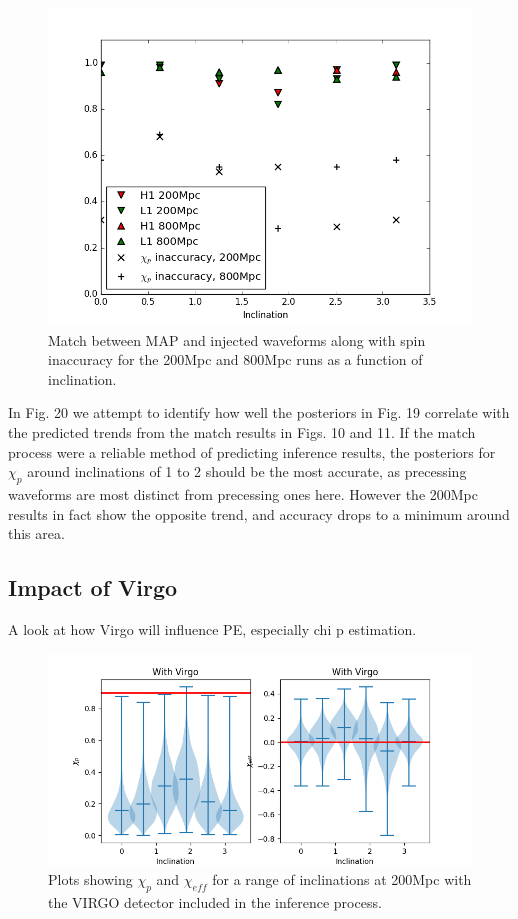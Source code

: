 \documentclass[11pt]{article}
\begin{document}
\begin{figure}[h]
	\includegraphics[scale=0.6]{fig20.png}
	\centering
	\caption{Match between MAP and injected waveforms along with spin inaccuracy for the 200Mpc and 800Mpc runs as a function of inclination.}
	\centering
\end{figure}

In Fig. 20 we attempt to identify how well the posteriors in Fig. 19 correlate with the predicted trends from the match results in Figs. 10 and 11. If the match process were a reliable method of predicting inference results, the posteriors for $\chi_p$ around inclinations of 1 to 2 should be the most accurate, as precessing waveforms are most distinct from precessing ones here. However the 200Mpc results in fact show the opposite trend, and accuracy drops to a minimum around this area. 
\subsection{Impact of Virgo}
A look at how Virgo will influence PE, especially chi p estimation.
\begin{figure}[h]
	\includegraphics[width=1\textwidth]{fig21.png}
	\centering
	\caption{Plots showing $\chi_p$ and $\chi_{eff}$ for a range of inclinations at 200Mpc with the VIRGO detector included in the inference process.}
	\centering
\end{figure}
\end{document}
